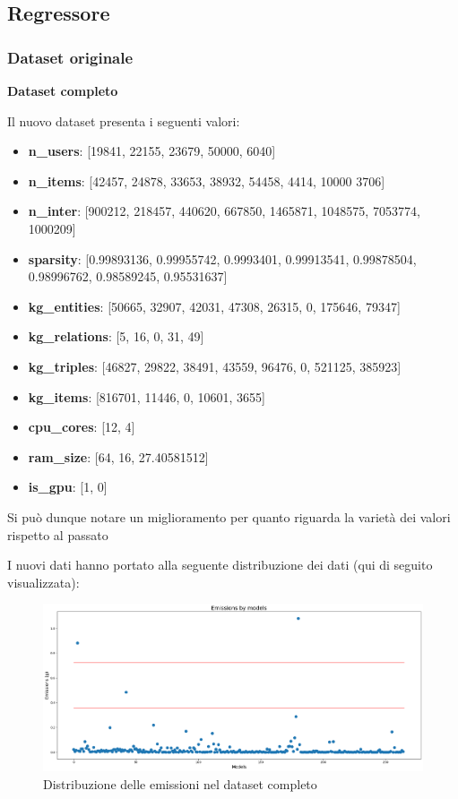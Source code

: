 \subsection{Regressore}

\subsubsection{Dataset originale}


\noindent \textbf{Dataset completo}


\noindent Il nuovo dataset presenta i seguenti valori:
\begin{itemize}
    \item \textbf{n\_users}: [19841, 22155, 23679, 50000, 6040]
    \item \textbf{n\_items}: [42457, 24878, 33653, 38932, 54458, 4414, 10000 3706]
    \item \textbf{n\_inter}: [900212, 218457, 440620, 667850, 1465871, 1048575, 7053774, 1000209]
    \item \textbf{sparsity}: [0.99893136, 0.99955742, 0.9993401, 0.99913541, 0.99878504, 0.98996762,
    0.98589245, 0.95531637]
    \item \textbf{kg\_entities}: [50665, 32907, 42031, 47308, 26315, 0, 175646, 79347]
    \item \textbf{kg\_relations}: [5, 16, 0, 31, 49]
    \item \textbf{kg\_triples}: [46827, 29822, 38491, 43559, 96476, 0, 521125, 385923]
    \item \textbf{kg\_items}: [816701, 11446, 0, 10601, 3655]
    \item \textbf{cpu\_cores}: [12, 4]
    \item \textbf{ram\_size}: [64, 16, 27.40581512]
    \item \textbf{is\_gpu}: [1, 0]
\end{itemize}

\noindent Si può dunque notare un miglioramento per quanto riguarda la varietà dei valori rispetto al passato

\noindent I nuovi dati hanno portato alla seguente distribuzione dei dati (qui di seguito visualizzata):
\begin{figure}[H]
    \centering
    \includegraphics[scale=0.25]{images/nuova-situazione.png}
    \caption{Distribuzione delle emissioni nel dataset completo}
\end{figure}

